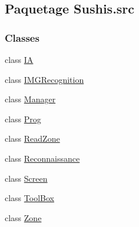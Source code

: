 \hypertarget{namespaceSushis_1_1src}{}\subsection{Paquetage Sushis.\+src}
\label{namespaceSushis_1_1src}
\subsubsection*{Classes}
\begin{DoxyCompactItemize}
\item 
class \hyperlink{classSushis_1_1src_1_1IA}{I\+A}
\item 
class \hyperlink{classSushis_1_1src_1_1IMGRecognition}{I\+M\+G\+Recognition}
\item 
class \hyperlink{classSushis_1_1src_1_1Manager}{Manager}
\item 
class \hyperlink{classSushis_1_1src_1_1Prog}{Prog}
\item 
class \hyperlink{classSushis_1_1src_1_1ReadZone}{Read\+Zone}
\item 
class \hyperlink{classSushis_1_1src_1_1Reconnaissance}{Reconnaissance}
\item 
class \hyperlink{classSushis_1_1src_1_1Screen}{Screen}
\item 
class \hyperlink{classSushis_1_1src_1_1ToolBox}{Tool\+Box}
\item 
class \hyperlink{classSushis_1_1src_1_1Zone}{Zone}
\end{DoxyCompactItemize}
